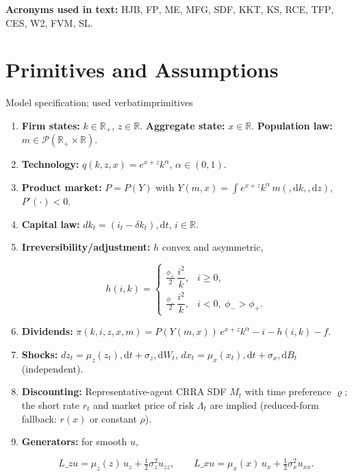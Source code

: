\documentclass[11pt,letterpaper,oneside]{article}
\numberwithin{equation}{section}
\newcommand{\ac}[1]{{\mdseries\textsc{#1}}}
\newcommand{\printacronyms}{}
\newcommand{\R}{\mathbb{R}}
\newcommand{\1}{\mathbf{1}}
\newcommand{\diff}{,\mathrm{d}}
\newcommand{\Lz}{L\_z}
\newcommand{\Lx}{L\_x}
\newcommand{\YY}{Y(m,x)}
\begin{document}
\medskip
\noindent\textbf{Acronyms used in text:} \ac{HJB}, \ac{FP}, \ac{ME}, \ac{MFG}, \ac{SDF}, \ac{KKT}, \ac{KS}, \ac{RCE}, \ac{TFP}, \ac{CES}, \ac{W2}, \ac{FVM}, \ac{SL}.
\medskip

\printacronyms

\section{Primitives and Assumptions}

\begin{assumption}{Model specification; used verbatim}{primitives}
\begin{enumerate}[label=(\roman*),itemsep=0.25em]
\item \textbf{Firm states:} $k\in\R_+$, $z\in\R$. \textbf{Aggregate state:} $x\in\R$. \textbf{Population law:} $m\in\mathcal P(\R_+\times\R)$.
\item \textbf{Technology:} $q(k,z,x)=e^{x+z}k^\alpha$, $\alpha\in(0,1)$.
\item \textbf{Product market:} $P=P(Y)$ with $Y(m,x)=\int e^{x+z}k^\alpha\, m(\diff k,\diff z)$, $P'(\cdot)<0$.
\item \textbf{Capital law:} $dk_t=(i_t-\delta k_t)\diff t$, $i\in\R$.
\item \textbf{Irreversibility/adjustment:} $h$ convex and asymmetric,

$$
h(i,k)=
\begin{cases}
\tfrac{\phi_+}{2}\,\dfrac{i^2}{k}, & i\ge 0,\\[3pt]
\tfrac{\phi_-}{2}\,\dfrac{i^2}{k}, & i<0,\ \phi_->\phi_+.
\end{cases}
$$

\item \textbf{Dividends:} $\pi(k,i,z,x,m)=P(\YY)\,e^{x+z}k^\alpha - i - h(i,k) - f$.
\item \textbf{Shocks:} $dz_t=\mu_z(z_t)\diff t+\sigma_z\diff W_t$, $dx_t=\mu_x(x_t)\diff t+\sigma_x\diff B_t$ (independent).
\item \textbf{Discounting:} Representative-agent CRRA SDF $M_t$ with time preference $\varrho$; the short rate $r_t$ and market price of risk $\Lambda_t$ are implied (reduced-form fallback: $r(x)$ or constant $\rho$).
\item \textbf{Generators:} for smooth $u$,

$$
\Lz u=\mu_z(z)\,u_z+\tfrac12\sigma_z^2 u_{zz},\qquad
\Lx u=\mu_x(x)\,u_x+\tfrac12\sigma_x^2 u_{xx}.
$$

\end{enumerate}
\end{assumption}
\end{document}
